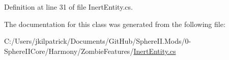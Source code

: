 Definition at line 31 of file Inert\+Entity.\+cs.



The documentation for this class was generated from the following file\+:\begin{DoxyCompactItemize}
\item 
C\+:/\+Users/jkilpatrick/\+Documents/\+Git\+Hub/\+Sphere\+I\+I.\+Mods/0-\/\+Sphere\+I\+I\+Core/\+Harmony/\+Zombie\+Features/\mbox{\hyperlink{_inert_entity_8cs}{Inert\+Entity.\+cs}}\end{DoxyCompactItemize}
